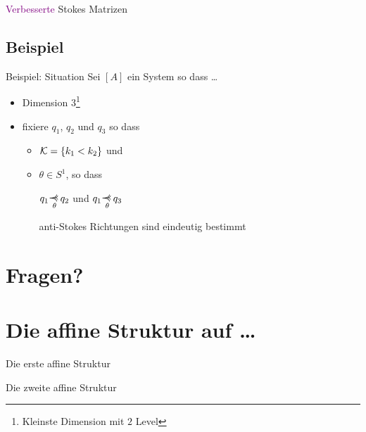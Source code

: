 \begin{frame}[fragile]{\textcolor{purple}{Verbesserte} Stokes Matrizen}
\begin{center}
\begin{tikzpicture}[scale=3.1]

    \end{tikzpicture}
  \end{center}
\end{frame}

\subsection{Beispiel}
\begin{frame}{Beispiel: Situation}
  Sei $[A]$ ein System so dass \dots
  \begin{itemize}
  \item
    Dimension $3$\footnote{Kleinste Dimension mit $2$ Level}
  \item
    fixiere $q_1$, $q_2$ und $q_3$ so dass
    \begin{itemize}
    \item $\cK=\{k_1<k_2\}$ und
    \item $\theta\in S^1$, so dass
      \begin{einr}
        $q_1\myrel{\theta}q_2$ und $q_1\myrel{\theta}q_3$

        \Rightarrow{} anti-Stokes Richtungen sind eindeutig bestimmt
      \end{einr}
    \end{itemize}
  \end{itemize}
\end{frame}

\section*{Fragen?}

\section{Die affine Struktur auf \dots}
\begin{frame}{Die erste affine Struktur}

\end{frame}
\begin{frame}{Die zweite affine Struktur}

\end{frame}

